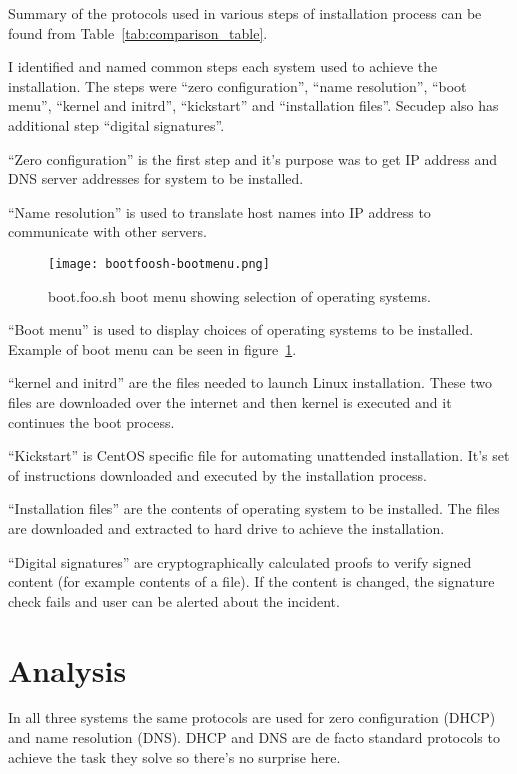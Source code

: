 Summary of the protocols used in various steps of installation process
can be found from Table~\ref{tab:comparison_table}.

I identified and named common steps each system used to achieve the
installation. The steps were ``zero configuration'', ``name
resolution'', ``boot menu'', ``kernel and initrd'', ``kickstart'' and
``installation files''. Secudep also has additional step ``digital
signatures''.

``Zero configuration'' is the first step and it's purpose was to get
IP address and DNS server addresses for system to be installed.

``Name resolution'' is used to translate host names into IP address to
communicate with other servers.

\begin{figure}[h]
  \texttt{[image: bootfoosh-bootmenu.png]}
  \caption{boot.foo.sh boot menu showing selection of operating systems.}
  \label{fig:bootmenu}
\end{figure}

``Boot menu'' is used to display choices of operating systems to be
installed. Example of boot menu can be seen in figure~\ref{fig:bootmenu}.

``kernel and initrd'' are the files needed to launch Linux
installation. These two files are downloaded over the internet and
then kernel is executed and it continues the boot process.

``Kickstart'' is CentOS specific file for automating unattended
installation. It's set of instructions downloaded and executed by the
installation process.

``Installation files'' are the contents of operating system to be
installed. The files are downloaded and extracted to hard drive to
achieve the installation.

``Digital signatures'' are cryptographically calculated proofs to
verify signed content (for example contents of a file). If the content
is changed, the signature check fails and user can be alerted about
the incident.

\section{Analysis}

In all three systems the same protocols are used for zero
configuration (DHCP) and name resolution (DNS). DHCP and DNS are de
facto standard protocols to achieve the task they solve so there's no
surprise here.

